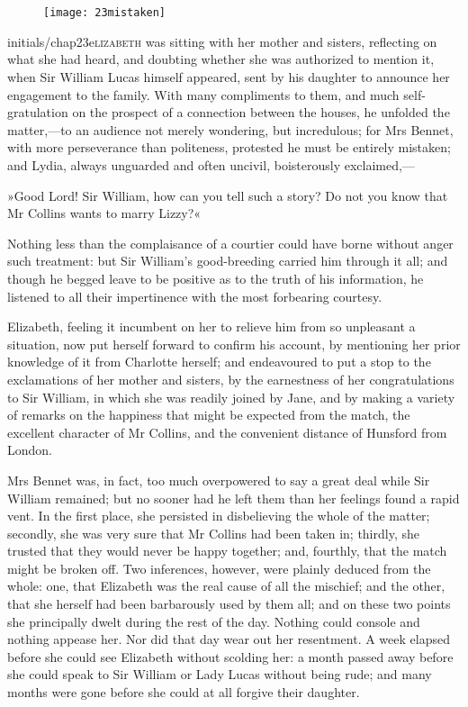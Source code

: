 \chapter[Chapter \thechapter]{}
	
\begin{figure}[t!]
\centering
\texttt{[image: 23mistaken]}
\end{figure}

\lettrine[lines=6,image=true]{initials/chap23e}{lizabeth}  was sitting with her mother and sisters, reflecting on what she had heard, and doubting whether she was authorized to mention it, when Sir William Lucas himself appeared, sent by his daughter to announce her engagement to the family. With many compliments to them, and much self-gratulation on the prospect of a connection between the houses, he unfolded the matter,—to an audience not merely wondering, but incredulous; for Mrs Bennet, with more perseverance than politeness, protested he must be entirely mistaken; and Lydia, always unguarded and often uncivil, boisterously exclaimed,—

»Good Lord! Sir William, how can you tell such a story? Do not you know that Mr Collins wants to marry Lizzy?«

Nothing less than the complaisance of a courtier could have borne without anger such treatment: but Sir William's good-breeding carried him through it all; and though he begged leave to be positive as to the truth of his information, he listened to all their impertinence with the most forbearing courtesy.

Elizabeth, feeling it incumbent on her to relieve him from so unpleasant a situation, now put herself forward to confirm his account, by mentioning her prior knowledge of it from Charlotte herself; and endeavoured to put a stop to the exclamations of her mother and sisters, by the earnestness of her congratulations to Sir William, in which she was readily joined by Jane, and by making a variety of remarks on the happiness that might be expected from the match, the excellent character of Mr Collins, and the convenient distance of Hunsford from London.

Mrs Bennet was, in fact, too much overpowered to say a great deal while Sir William remained; but no sooner had he left them than her feelings found a rapid vent. In the first place, she persisted in disbelieving the whole of the matter; secondly, she was very sure that Mr Collins had been taken in; thirdly, she trusted that they would never be happy together; and, fourthly, that the match might be broken off. Two inferences, however, were plainly deduced from the whole: one, that Elizabeth was the real cause of all the mischief; and the other, that she herself had been barbarously used by them all; and on these two points she principally dwelt during the rest of the day. Nothing could console and nothing appease her. Nor did that day wear out her resentment. A week elapsed before she could see Elizabeth without scolding her: a month passed away before she could speak to Sir William or Lady Lucas without being rude; and many months were gone before she could at all forgive their daughter.

